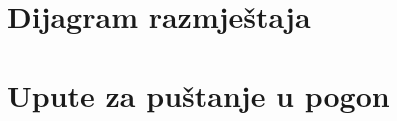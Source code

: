 			 
	
			\eject 
		
		
		\section{Dijagram razmještaja}
			
			
			
			\eject 
		
		\section{Upute za puštanje u pogon}
		
		
			
			
			
			
			\eject 